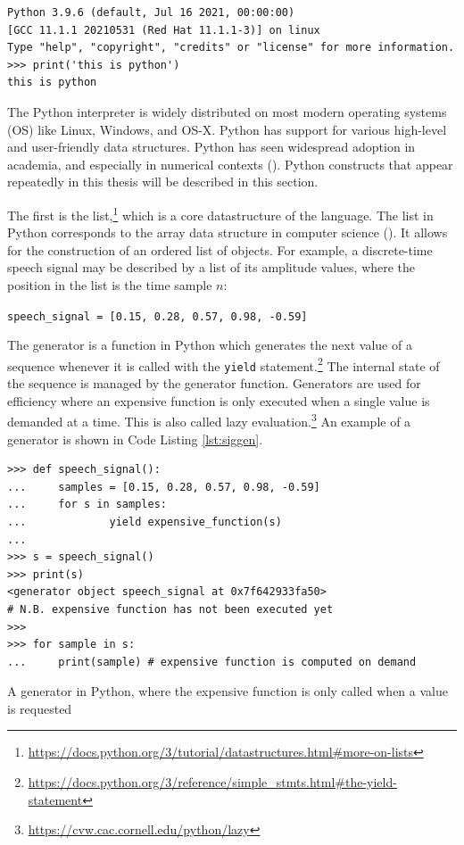 \documentclass[report.tex]{subfiles}
\begin{document}
\begin{listing}[!ht]
\centering
\begin{BVerbatim}
Python 3.9.6 (default, Jul 16 2021, 00:00:00)
[GCC 11.1.1 20210531 (Red Hat 11.1.1-3)] on linux
Type "help", "copyright", "credits" or "license" for more information.
>>> print('this is python')
this is python
\end{BVerbatim}
\end{listing}

The Python interpreter is widely distributed on most modern operating systems (OS) like Linux, Windows, and OS-X. Python has support for various high-level and user-friendly data structures. Python has seen widespread adoption in academia, and especially in numerical contexts (\cite{pythonscience}). Python constructs that appear repeatedly in this thesis will be described in this section.

The first is the list,\footnote{\url{https://docs.python.org/3/tutorial/datastructures.html\#more-on-lists}} which is a core datastructure of the language. The list in Python corresponds to the array data structure in computer science (\cite{skiena}). It allows for the construction of an ordered list of objects. For example, a discrete-time speech signal may be described by a list of its amplitude values, where the position in the list is the time sample $n$:

\hfill \Verb#speech_signal = [0.15, 0.28, 0.57, 0.98, -0.59]#

The generator is a function in Python which generates the next value of a sequence whenever it is called with the \Verb#yield# statement.\footnote{\url{https://docs.python.org/3/reference/simple_stmts.html\#the-yield-statement}} The internal state of the sequence is managed by the generator function. Generators are used for efficiency where an expensive function is only executed when a single value is demanded at a time. This is also called lazy evaluation.\footnote{\url{https://cvw.cac.cornell.edu/python/lazy}} An example of a generator is shown in Code Listing \ref{lst:siggen}.

\begin{listing}[ht]
\centering
\begin{BVerbatim}
>>> def speech_signal():
...     samples = [0.15, 0.28, 0.57, 0.98, -0.59]
...     for s in samples:
...             yield expensive_function(s)
...
>>> s = speech_signal()
>>> print(s)
<generator object speech_signal at 0x7f642933fa50>
# N.B. expensive function has not been executed yet
>>>
>>> for sample in s:
...     print(sample) # expensive function is computed on demand
\end{BVerbatim}
	\caption{A generator in Python, where the expensive function is only called when a value is requested}
	\label{lst:siggen}
\end{listing}
\end{document}
